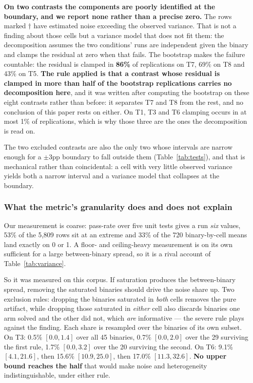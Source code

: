\textbf{On two contrasts the components are poorly identified at the boundary, and we report none rather
than a precise zero.} The rows marked $\dagger$ have estimated noise exceeding the observed variance. That
is not a finding about those cells but a variance model that does not fit them: the decomposition assumes
the two conditions' runs are independent given the binary and clamps the residual at zero when that fails.
The bootstrap makes the failure countable: the residual is clamped in \textbf{86\%} of replications on T7,
69\% on T8 and 43\% on T5. \textbf{The rule applied is that a contrast whose residual is clamped in more than half of the bootstrap
replications carries no decomposition here}, and it was written after computing the bootstrap on these
eight contrasts rather than before: it separates T7 and T8 from the rest, and no conclusion of this paper
rests on either. On T1, T3 and T6 clamping occurs in at most 1\% of replications, which is why those three
are the ones the decomposition is read on.

The two excluded contrasts are also the only two whose intervals are narrow enough for a $\pm3$pp boundary
to fall outside them (Table~\ref{tab:tests}), and that is mechanical rather than coincidental: a cell with
very little observed variance yields both a narrow interval and a variance model that collapses at the
boundary.

\subsubsection*{What the metric's granularity does and does not explain}
\label{sec:granularita}

Our measurement is coarse: pass-rate over five unit tests gives a run \emph{six} values, 53\% of the
5{,}809 rows sit at an extreme and 33\% of the 720 binary-by-cell means land exactly on 0 or 1. A floor-
and ceiling-heavy measurement is on its own sufficient for a large between-binary spread, so it is a rival
account of Table~\ref{tab:variance}.

So it was measured on this corpus. If saturation produces the between-binary spread, removing the saturated
binaries should drive the noise share up. Two exclusion rules: dropping the binaries saturated in
\emph{both} cells removes the pure artifact, while dropping those saturated in \emph{either} cell also
discards binaries one arm solved and the other did not, which \emph{are} informative --- the severe rule
plays against the finding. Each share is resampled over the binaries of its own subset. On T3: 0.5\%
$[0.0, 1.4]$ over all 45 binaries, 0.7\% $[0.0, 2.0]$ over the 29 surviving the first rule, 1.7\% $[0.0,
3.2]$ over the 20 surviving the second. On T6: 9.1\% $[4.1, 21.6]$, then 15.6\% $[10.9, 25.0]$, then
17.0\% $[11.3, 32.6]$. \textbf{No upper bound reaches the half} that would make noise and heterogeneity
indistinguishable, under either rule.

